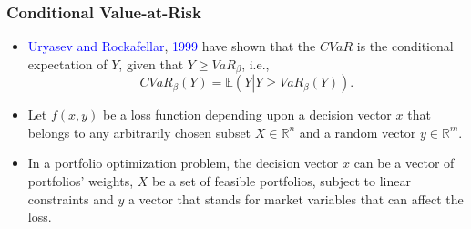 \documentclass[pdf,9pt,xcolor=dvipsnames,hide notes]{beamer}
\begin{document}
\begin{frame}[label=frame2b3]
	\frametitle{Conditional Value-at-Risk}
	\begin{itemize}
		\justifying
		
		\item \textcolor{blue}{Uryasev and Rockafellar}, \textcolor{blue}{1999} have shown that the $CVaR$ is the conditional
		expectation of $Y$, given that $Y\geq VaR_{\beta }$, i.e.,
		\begin{equation}
		CVaR_{\beta }\left( Y\right) =\mathbb{E}\left( Y\left\vert Y\geq VaR_{\beta
		}\left( Y\right) \right. \right) .  \label{three}
		\end{equation}
		
		\vspace{0.3cm}
		
		\item Let $f\left( x,y\right) $ be a loss function depending upon a decision
		vector $x$ that belongs to any arbitrarily chosen subset $X\in
		\mathbb{R}
		^{n}$ and a random vector $y\in
		\mathbb{R}
		^{m}$. 
		
			\vspace{0.3cm}
		
		\item In a portfolio optimization problem, the decision vector $x$ can be a
		vector of portfolios' weights, $X$ be a set of feasible portfolios,
		subject to linear constraints and $y$ a vector that stands for market variables that can affect the loss.
		
	\end{itemize}
	
\end{frame}
\end{document}

